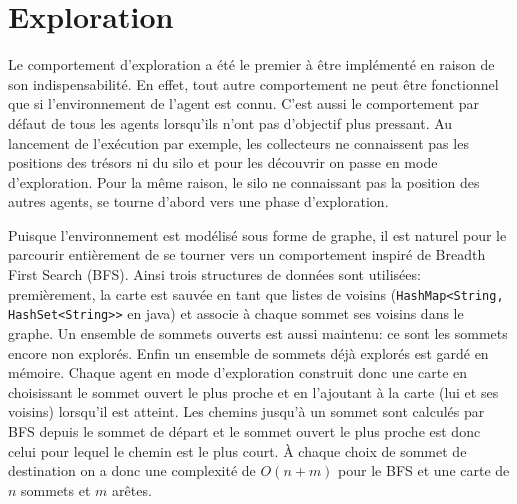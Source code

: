 \documentclass[11pt]{article}
\begin{document}
\section{Exploration}
Le comportement d'exploration a été le premier à être implémenté en raison de son indispensabilité. En effet, tout autre comportement ne peut être fonctionnel que si l'environnement de l'agent est connu. C'est aussi le comportement par défaut de tous les agents lorsqu'ils n'ont pas d'objectif plus pressant. Au lancement de l'exécution par exemple, les collecteurs ne connaissent pas les positions des trésors ni du silo et pour les découvrir on passe en mode d'exploration. Pour la même raison, le silo ne connaissant pas la position des autres agents, se tourne d'abord vers une phase d'exploration.

Puisque l'environnement est modélisé sous forme de graphe, il est naturel pour le parcourir entièrement de se tourner vers un comportement inspiré de Breadth First Search (BFS). Ainsi trois structures de données sont utilisées: premièrement, la carte est sauvée en tant que listes de voisins (\texttt{HashMap<String, HashSet<String>{}>} en java) et associe à chaque sommet ses voisins dans le graphe. Un ensemble de sommets ouverts est aussi maintenu: ce sont les sommets encore non explorés. Enfin un ensemble de sommets déjà explorés est gardé en mémoire. Chaque agent en mode d'exploration construit donc une carte en choisissant le sommet ouvert le plus proche et en l'ajoutant à la carte (lui et ses voisins)  lorsqu'il est atteint. Les chemins jusqu'à un sommet sont calculés par BFS depuis le sommet de départ et le sommet ouvert le plus proche est donc celui pour lequel le chemin est le plus court. À chaque choix de sommet de destination on a donc une complexité de $O(n + m)$ pour le BFS et une carte de $n$ sommets et $m$ arêtes.
\end{document}
